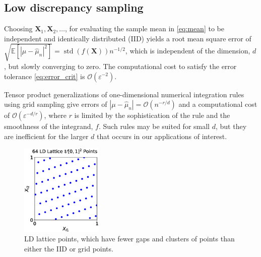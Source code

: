 \documentclass[11pt]{NSFamsart}
\newcommand{\cmtS}[1]{{\color{blue}{(Simon: #1)}}}
\DeclareMathOperator{\std}{std}
\newcommand{\bbE}{\mathbb{E}}
\newcommand{\bX}{{\boldsymbol{X}}}
\def\abs#1{\ensuremath{\left \lvert #1 \right \rvert}}
\newcommand{\Order}{\mathcal{O}}
\newcommand{\hmu}{\hat{\mu}}
\begin{document}
\cmtS{should we talk briefly about some of the complexities in the problem formulation (e.g., distributions, quantiles) which we'll tackle later?}


\subsection{Low discrepancy sampling}

Choosing $\bX_1, \bX_2, \ldots$, for evaluating the sample mean in \eqref{eq:mean} to be independent and identically distributed (IID) yields a root mean square error of $\sqrt{\bbE[\abs{\mu -\hmu_n}^2]} = \std(f(\bX))n^{-1/2}$, which is independent of the dimension, $d$, but slowly converging to zero. The computational cost to satisfy the error tolerance \eqref{eq:error_crit} is $\Order(\varepsilon^{-2})$.

Tensor product generalizations of one-dimensional numerical integration rules using grid sampling give errors of $\abs{\mu -\hmu_n} = \Order(n^{-r/d})$ and a computational cost of $\Order(\varepsilon^{-d/r})$, where $r$ is limited by the sophistication of the rule and the smoothness of the integrand, $f$.  Such rules may be suited for small $d$, but they are inefficient for the larger $d$ that occurs in our applications of interest.

\begin{figure}
	\centering
	\includegraphics[width = 0.35\textwidth]{ProgramsImages/lattice_scatter.eps}
	\caption{LD lattice points, which have fewer gaps and clusters of points than either the IID or grid points. \label{fig:iid_vs_ld}}
\end{figure}
\end{document}
